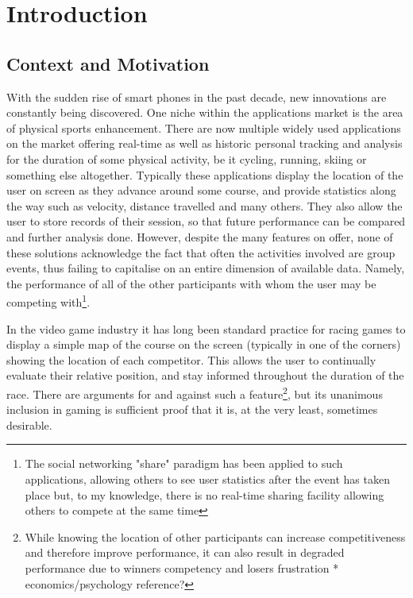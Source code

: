 \setcounter{page}{1}
\pagestyle{headings}

\chapter{Introduction}

\section{Context and Motivation}

With the sudden rise of smart phones in the past decade, new innovations are constantly being discovered. One niche within the applications market is the area of physical sports enhancement. There are now multiple widely used applications on the market offering real-time as well as historic personal tracking and analysis for the duration of some physical activity, be it cycling, running, skiing or something else altogether.
Typically these applications display the location of the user on screen as they advance around some course, and provide statistics along the way such as velocity, distance travelled and many others. They also allow the user to store records of their session, so that future performance can be compared and further analysis done.
However, despite the many features on offer, none of these solutions acknowledge the fact that often the activities involved are group events, thus failing to capitalise on an entire dimension of available data. Namely, the performance of all of the other participants with whom the user may be competing with\footnote{The social networking "share" paradigm has been applied to such applications, allowing others to see user statistics after the event has taken place but, to my knowledge, there is no real-time sharing facility allowing others to compete at the same time}.

In the video game industry it has long been standard practice for racing games to display a simple map of the course on the screen (typically in one of the corners) showing the location of each competitor. This allows the user to continually evaluate their relative position, and stay informed throughout the duration of the race. There are arguments for and against such a feature\footnote{While knowing the location of other participants can increase competitiveness and therefore improve performance, it can also result in degraded performance due to winners competency and losers frustration * economics/psychology reference?}, but its unanimous inclusion in gaming is sufficient proof that it is, at the very least, sometimes desirable.

